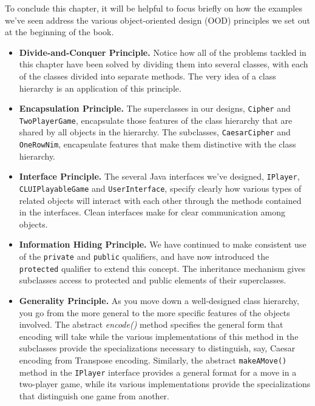 To conclude this chapter, it will be helpful to focus briefly on how
the examples we've seen address the various object-oriented design
(OOD) principles we set out at the beginning of the book.

\begin{itemize}
\item {\bf Divide-and-Conquer Principle.}  Notice how all of the
problems tackled in this chapter have been solved by dividing them
into several classes, with each of the classes divided into separate
methods.  The very idea of a class hierarchy is an application of
this principle.

\item {\bf Encapsulation Principle.} The superclasses in our designs,
{\tt Cipher} and {\tt TwoPlayerGame}, encapsulate those features of the
class hierarchy that are shared by all objects in the hierarchy. The
subclasses, {\tt CaesarCipher} and {\tt OneRowNim}, encapsulate features
that make them distinctive with the class hierarchy. 

\item {\bf Interface Principle.}  The several Java interfaces we've
designed, {\tt IPlayer}, {\tt CLUIPlayableGame} and {\tt UserInterface},
specify clearly how various types of related objects will interact
with each other through the methods contained in the interfaces.
Clean interfaces make for clear communication among objects.

\item {\bf Information Hiding Principle.} We have continued to make
consistent use of the {\tt private} and {\tt public} qualifiers, and have
now introduced the {\tt protected} qualifier to extend this concept. 
The inheritance mechanism gives subclasses access to protected and
public elements of their superclasses.  

\item {\bf Generality Principle.}  As you move down a well-designed
class hierarchy, you go from the more general to the more specific
features of the objects involved. The abstract {\em encode()} method
specifies the general form that encoding will take while the various
implementations of this method in the subclasses provide the
specializations necessary to distinguish, say, Caesar encoding from
Transpose encoding.  Similarly, the abstract {\tt makeAMove()} method
in the {\tt IPlayer} interface  provides a general format for
a move in a two-player game, while its various implementations provide
the specializations that distinguish one game from another.


\end{itemize}
